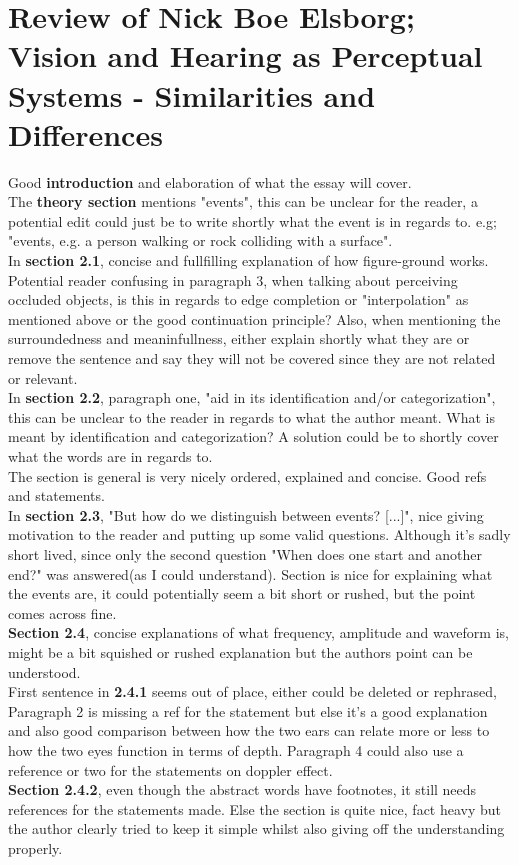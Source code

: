 \documentclass{article}
\begin{document}
\section{Review of Nick Boe Elsborg; Vision and Hearing as Perceptual Systems - Similarities and Differences}


Good \textbf{introduction} and elaboration of what the essay will cover.\\
The \textbf{theory section} mentions "events", this can be unclear for the reader, a potential edit could just be to write shortly what the event is in regards to. e.g; "events, e.g. a person walking or rock colliding with a surface".\medskip \\
In \textbf{section 2.1}, concise and fullfilling explanation of how figure-ground works. Potential reader confusing in paragraph 3, when talking about perceiving occluded objects, is this in regards to edge completion or "interpolation" as mentioned above or the good continuation principle? Also, when mentioning the surroundedness and meaninfullness, either explain shortly what they are or remove the sentence and say they will not be covered since they are not related or relevant.\medskip \\
In \textbf{section 2.2}, paragraph one, "aid in its identification and/or categorization", this can be unclear to the reader in regards to what the author meant. What is meant by identification and categorization? A solution could be to shortly cover what the words are in regards to.\\The section is general is very nicely ordered, explained and concise. Good refs and statements.\medskip \\
In \textbf{section 2.3}, "But how do we distinguish between events? [...]", nice giving motivation to the reader and putting up some valid questions. Although it's sadly short lived, since only the second question "When does one start and another end?" was answered(as I could understand). Section is nice for explaining what the events are, it could potentially seem a bit short or rushed, but the point comes across fine.\medskip \\
\textbf{Section 2.4}, concise explanations of what frequency, amplitude and waveform is, might be a bit squished or rushed explanation but the authors point can be understood.\\First sentence in \textbf{2.4.1} seems out of place, either could be deleted or rephrased, Paragraph 2 is missing a ref for the statement but else it's a good explanation and also good comparison between how the two ears can relate more or less to how the two eyes function in terms of depth. Paragraph 4 could also use a reference or two for the statements on doppler effect.\\\textbf{Section 2.4.2}, even though the abstract words have footnotes, it still needs references for the statements made. Else the section is quite nice, fact heavy but the author clearly tried to keep it simple whilst also giving off the understanding properly.\medskip \\
\end{document}
